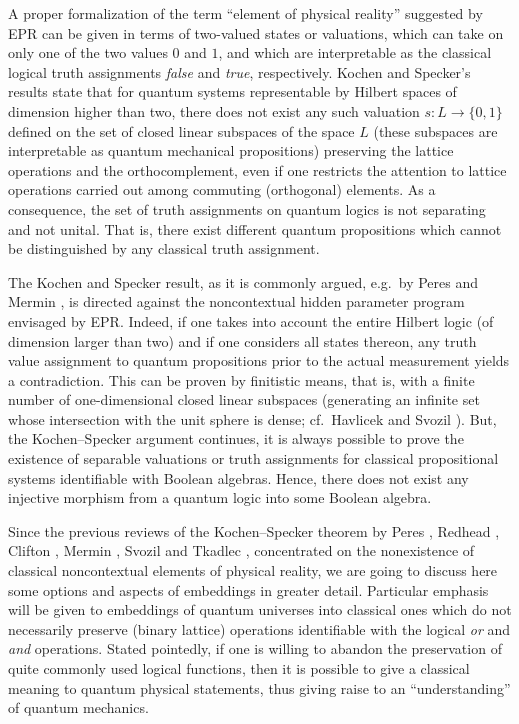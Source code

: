 A proper formalization of the term ``element of physical reality''
suggested by EPR can be given in terms of two-valued states or valuations,
which can take on only one of the two values $0$ and $1$, and which are
interpretable as the classical logical truth assignments {\it false} and
{\it true}, respectively.  Kochen and Specker's results
\cite{kochen1} state that for quantum systems representable by Hilbert
spaces of dimension higher than two, there does not exist any such valuation
$s: L\rightarrow \{0,1\}$ defined
on the set of closed linear subspaces of the space $L$
(these subspaces are interpretable as quantum mechanical propositions)
preserving the lattice operations and the orthocomplement,
even if one restricts the attention to lattice operations carried out among
commuting (orthogonal) elements.
As a consequence, the set of truth assignments on quantum logics is not
separating and not unital. That is, there exist  different quantum propositions
which cannot be distinguished by any classical truth assignment.

The Kochen and Specker result, as it is commonly argued, e.g.\ by
Peres \cite{peres} and Mermin \cite{mermin-93}, is directed against
the noncontextual hidden parameter program envisaged by EPR. Indeed, if one
takes into account the entire Hilbert logic  (of dimension
larger than two) and if one considers all states thereon, any truth
value assignment to quantum propositions prior to the actual measurement
yields a contradiction. This can be proven by finitistic means, that is,
with a finite number of one-dimensional closed linear subspaces (generating an
infinite  set whose intersection with the unit sphere is dense;
cf.\ Havlicek and Svozil \cite{havlicek}).
But, the Kochen--Specker argument continues, it is always possible to
prove the existence of separable valuations or truth assignments for
classical propositional systems identifiable with
Boolean algebras. Hence, there does not exist any  injective
morphism from a quantum logic into some Boolean algebra.

Since the previous reviews of the Kochen--Specker theorem by
Peres \cite{peres-91,peres}, Redhead \cite{redhead},
Clifton \cite{clifton-93}, Mermin \cite{mermin-93},
Svozil and Tkadlec \cite{svozil-tkadlec}, concentrated on
the nonexistence of classical noncontextual elements of physical reality,
we are going to discuss here some options and aspects of embeddings in
greater detail.
Particular emphasis will be given to embeddings of
quantum universes into classical ones which do not
necessarily preserve (binary lattice) operations identifiable with the
logical {\it or} and {\it and} operations. Stated pointedly, if one is
willing to abandon the preservation of quite commonly used logical
functions, then it is possible to give a classical meaning to quantum
physical statements, thus giving raise to an ``understanding'' of
quantum mechanics.

